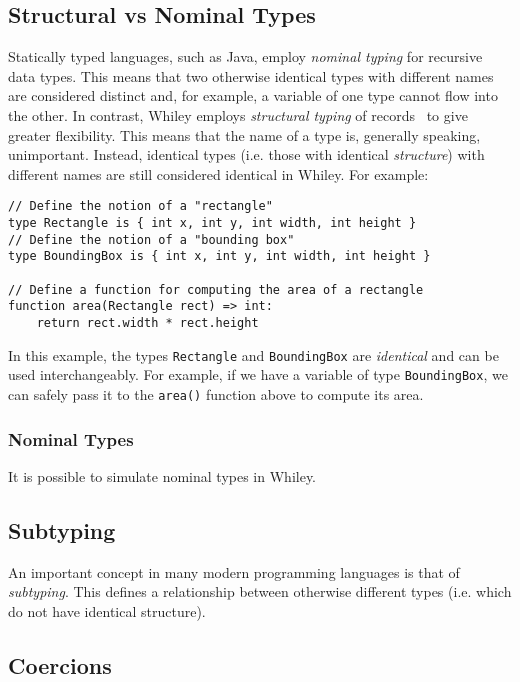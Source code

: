\subsection{Structural vs Nominal Types}
Statically typed languages, such as Java, employ {\em nominal typing}
for recursive data types.  This means that two otherwise identical
types with different names are considered distinct and, for example, a
variable of one type cannot flow into the other.  In contrast, Whiley employs {\em structural typing} of records~\cite{Card88} to give greater flexibility.  This means that the name of a type is, generally speaking, unimportant.  Instead, identical types (i.e. those with identical {\em structure}) with different names are still considered identical in Whiley.  For example:

\begin{lstlisting}
// Define the notion of a "rectangle"
type Rectangle is { int x, int y, int width, int height }
// Define the notion of a "bounding box"
type BoundingBox is { int x, int y, int width, int height }

// Define a function for computing the area of a rectangle
function area(Rectangle rect) => int:
    return rect.width * rect.height
\end{lstlisting}

In this example, the types \lstinline{Rectangle} and \lstinline{BoundingBox} are {\em identical} and can be used interchangeably.  For example, if we have a variable of type \lstinline{BoundingBox}, we can safely pass it to the \lstinline{area()} function above to compute its area.

\subsubsection{Nominal Types}

It is possible to simulate nominal types in Whiley.

\subsection{Subtyping}

An important concept in many modern programming languages is that of {\em subtyping}.  This defines a relationship between otherwise different types (i.e. which do not have identical structure).  

\subsection{Coercions}

